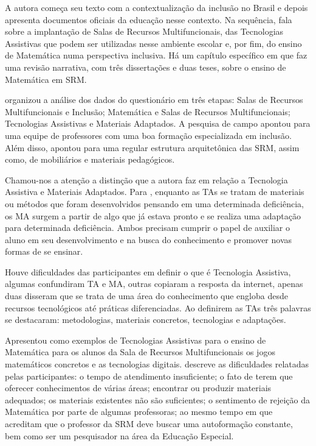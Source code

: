 \documentclass[portuguese]{textolivre}
\begin{document}
A autora começa seu texto com a contextualização da inclusão no Brasil e
depois apresenta documentos oficiais da educação nesse contexto. Na
sequência, fala sobre a implantação de Salas de Recursos
Multifuncionais, das Tecnologias Assistivas que podem ser utilizadas
nesse ambiente escolar e, por fim, do ensino de Matemática numa
perspectiva inclusiva. Há um capítulo específico em que \textcite{gubert2022}
faz uma revisão narrativa, com três dissertações e duas teses, sobre o
ensino de Matemática em SRM.

\textcite{gubert2022} organizou a análise dos dados do questionário em três
etapas: Salas de Recursos Multifuncionais e Inclusão; Matemática e Salas
de Recursos Multifuncionais; Tecnologias Assistivas e Materiais
Adaptados. A pesquisa de campo apontou para uma equipe de professores
com uma boa formação especializada em inclusão. Além disso, apontou para
uma regular estrutura arquitetônica das SRM, assim como, de mobiliários
e materiais pedagógicos.


Chamou-nos a atenção a distinção que
a autora faz em relação a Tecnologia Assistiva e Materiais Adaptados.
Para \textcite{gubert2022}, enquanto as TAs se tratam de materiais ou métodos
que foram desenvolvidos pensando em uma determinada deficiência, os MA
surgem a partir de algo que já estava pronto e se realiza uma adaptação
para determinada deficiência. Ambos precisam cumprir o papel de auxiliar
o aluno em seu desenvolvimento e na busca do conhecimento e promover
novas formas de se ensinar.

Houve dificuldades das participantes em definir o que é Tecnologia
Assistiva, algumas confundiram TA e MA, outras copiaram a resposta da
internet, apenas duas disseram que se trata de uma área do conhecimento
que engloba desde recursos tecnológicos até práticas diferenciadas. Ao
definirem as TAs três palavras se destacaram: metodologias, materiais
concretos, tecnologias e adaptações.

Apresentou como exemplos de Tecnologias Assistivas para o ensino de
Matemática para os alunos da Sala de Recursos Multifuncionais os jogos
matemáticos concretos e as tecnologias digitais. \textcite{gubert2022} descreve
as dificuldades relatadas pelas participantes: o tempo de atendimento
insuficiente; o fato de terem que oferecer conhecimentos de várias
áreas; encontrar ou produzir materiais adequados; os materiais
existentes não são suficientes; o sentimento de rejeição da Matemática
por parte de algumas professoras; ao mesmo tempo em que acreditam que o
professor da SRM deve buscar uma autoformação constante, bem como ser um
pesquisador na área da Educação Especial.
\end{document}
